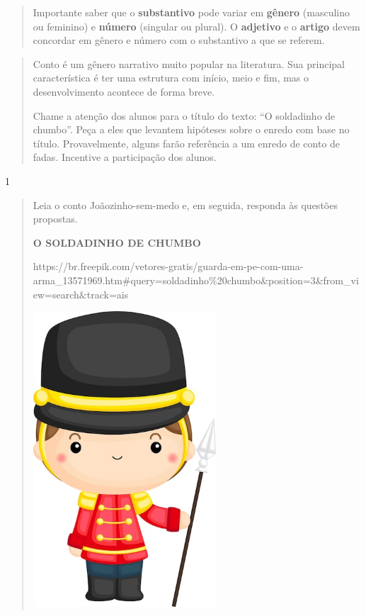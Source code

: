 \begin{itemize}
{{{\begin{itemize}
\begin{itemize}
\begin{itemize}
\begin{quote}
Importante saber que o \textbf{substantivo} pode variar em
\textbf{gênero} (masculino ou feminino) e \textbf{número} (singular ou
plural). O \textbf{adjetivo} e o \textbf{artigo} devem concordar em
gênero e número com o substantivo a que se referem.
\end{quote}


\begin{quote}
Conto é um gênero narrativo muito popular na literatura. Sua principal
característica é ter uma estrutura com início, meio e fim, mas o
desenvolvimento acontece de forma breve.

Chame a atenção dos alunos para o título do texto: ``O soldadinho de
chumbo''. Peça a eles que levantem hipóteses sobre o enredo com base no
título. Provavelmente, alguns farão referência a um enredo de conto de
fadas. Incentive a participação dos alunos.
\end{quote}

\num{1}

\begin{quote}
Leia o conto Joãozinho-sem-medo e, em seguida, responda às questões
propostas.

\textbf{O SOLDADINHO DE CHUMBO}

https://br.freepik.com/vetores-gratis/guarda-em-pe-com-uma-arma\_13571969.htm\#query=soldadinho\%20chumbo\&position=3\&from\_view=search\&track=ais

\includegraphics[width=2.68750in,height=4.34722in]{media/image24.jpeg}


\end{quote}
\end{itemize}
\end{itemize}
\end{itemize}}}}
\end{itemize}
